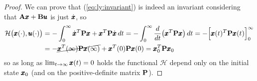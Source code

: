 	\begin{proof}
		We can prove that (\ref{eq:ly:invariant}) is indeed an invariant considering that $\A \x + \B \u$ is just $\dx$, so
		\begin{align*}
			\mathcal H\big(\x(\cdot), \u(\cdot)\big) & = -\int_0^\infty \dx^T \P \x + \x^T \P \dx \, dt = - \int_0^\infty \frac{d}{dt}\big(\x^T\P \x\big) \, dt = -\Big[\x(t)^T \P \x(t)\Big]_0^\infty \\
			& = - \cancel{\x^T(\infty) \P \x(\infty)} + \x^T(0) \P \x(0) = \x_0^T \P \x_0
		\end{align*}
		so as long as $\lim_{t\rightarrow\infty} \x(t) = 0$ holds the functional $\mathcal H$ depend only on the initial state $\x_0$ (and on the positive-definite matrix $\P$). 
	\end{proof}
	
